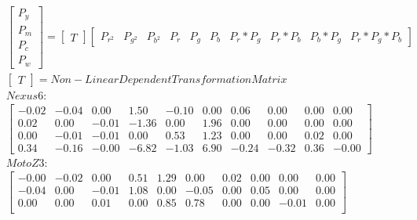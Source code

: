 \begin{subequations}
\begin{align}
	&\begin{bmatrix}
	    P_{y} \\
	    P_{m} \\
	    P_{c} \\
	    P_{w}
	\end{bmatrix}
	=
	\begin{bmatrix}
		T
	\end{bmatrix}
	\begin{bmatrix}
	    P_{r^2}            &
	    P_{g^2}            &
	    P_{b^2}            &
	    P_{r}              &
	    P_{g}              &
	    P_{b}              &
	    P_{r}*P_{g}        &
	    P_{r}*P_{b}        &
	    P_{b}*P_{g}        &
	    P_{r}*P_{g}*P_{b}
	\end{bmatrix}
	\\
	&\begin{bmatrix}
		T
	\end{bmatrix}
	=
		Non-Linear Dependent Transformation Matrix \nonumber
	\\
	&Nexus 6: \nonumber
	\\
	&\begin{bmatrix}
	     -0.02 &      -0.04 &       0.00 &       1.50 &      -0.10 &       0.00 &       0.06 &       0.00 &       0.00 &       0.00 \\
	      0.02 &       0.00 &      -0.01 &      -1.36 &       0.00 &       1.96 &       0.00 &       0.00 &       0.00 &       0.00 \\
	      0.00 &      -0.01 &      -0.01 &       0.00 &       0.53 &       1.23 &       0.00 &       0.00 &       0.02 &       0.00 \\
	      0.34 &      -0.16 &      -0.00 &      -6.82 &      -1.03 &       6.90 &      -0.24 &      -0.32 &       0.36 &      -0.00
	\end{bmatrix}
	\\
	&Moto Z3: \nonumber
	\\
	&\begin{bmatrix}
	     -0.00 &      -0.02 &       0.00 &       0.51 &       1.29 &       0.00 &       0.02 &       0.00 &       0.00 &       0.00 \\
	     -0.04 &       0.00 &      -0.01 &       1.08 &       0.00 &      -0.05 &       0.00 &       0.05 &       0.00 &       0.00 \\
	      0.00 &       0.00 &       0.01 &       0.00 &       0.85 &       0.78 &       0.00 &       0.00 &      -0.01 &       0.00 \\

\end{bmatrix}
\end{align}
\end{subequations}
